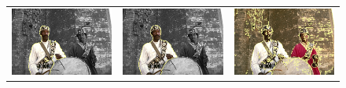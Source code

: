 \documentclass[smallextended]{svjour3}       %
\begin{document}
{{\begin{figure}[ht!]
\begin{tabular}{ccc}
		\includegraphics[scale=0.2]{images/segmentation/bc/man/gc-seg.png} &
		\includegraphics[scale=0.2]{images/segmentation/bc/man/corrected-seg.png} &
		\includegraphics[scale=0.2]{images/segmentation/schoenemann/man/man-seg.png}\\		

\end{tabular}
\end{figure}}}
\end{document}
